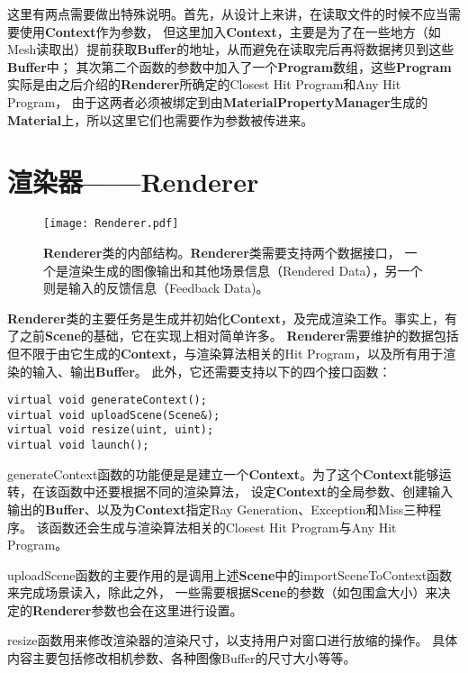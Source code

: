 这里有两点需要做出特殊说明。首先，从设计上来讲，在读取文件的时候不应当需要使用\textbf{Context}作为参数，
但这里加入\textbf{Context}，主要是为了在一些地方（如Mesh读取出）提前获取\textbf{Buffer}的地址，从而避免在读取完后再将数据拷贝到这些\textbf{Buffer}中；
其次第二个函数的参数中加入了一个\textbf{Program}数组，这些\textbf{Program}实际是由之后介绍的\textbf{Renderer}所确定的Closest Hit Program和Any Hit Program，
由于这两者必须被绑定到由\textbf{MaterialPropertyManager}生成的\textbf{Material}上，所以这里它们也需要作为参数被传进来。

\section{渲染器——Renderer}

\begin{figure}[h]
    \centering
    \texttt{[image: Renderer.pdf]}
    \caption{\textbf{Renderer}类的内部结构。\textbf{Renderer}类需要支持两个数据接口，
    一个是渲染生成的图像输出和其他场景信息（Rendered Data），另一个则是输入的反馈信息（Feedback Data)。}
    \label{tab:renderer}
\end{figure}

\textbf{Renderer}类的主要任务是生成并初始化\textbf{Context}，及完成渲染工作。事实上，有了之前\textbf{Scene}的基础，它在实现上相对简单许多。
\textbf{Renderer}需要维护的数据包括但不限于由它生成的\textbf{Context}，与渲染算法相关的Hit Program，以及所有用于渲染的输入、输出\textbf{Buffer}。
此外，它还需要支持以下的四个接口函数：

\lstset{language=C++}
\begin{lstlisting}
virtual void generateContext();
virtual void uploadScene(Scene&);
virtual void resize(uint, uint);
virtual void launch();
\end{lstlisting}

generateContext函数的功能便是是建立一个\textbf{Context}。为了这个\textbf{Context}能够运转，在该函数中还要根据不同的渲染算法，
设定\textbf{Context}的全局参数、创建输入输出的\textbf{Buffer}、以及为\textbf{Context}指定Ray Generation、Exception和Miss三种程序。
该函数还会生成与渲染算法相关的Closest Hit Program与Any Hit Program。

uploadScene函数的主要作用的是调用上述\textbf{Scene}中的importSceneToContext函数来完成场景读入，除此之外，
一些需要根据\textbf{Scene}的参数（如包围盒大小）来决定的\textbf{Renderer}参数也会在这里进行设置。

resize函数用来修改渲染器的渲染尺寸，以支持用户对窗口进行放缩的操作。
具体内容主要包括修改相机参数、各种图像Buffer的尺寸大小等等。

